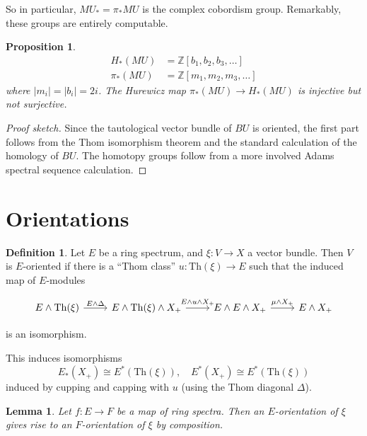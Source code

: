\documentclass{shortart}
\newtheorem{lemma}[thm]{Lemma}
\newtheorem{prop}[thm]{Proposition}
\theoremstyle{definition}
\newtheorem{defi}[thm]{Definition}
\newcommand\Th{\mathrm{Th}}
\newcommand\Z{\mathbb{Z}}
\begin{document}
So in particular, $MU_* = \pi_* MU$ is the complex cobordism group. Remarkably, these groups are entirely computable.
\begin{prop}
  \[
    \begin{aligned}
      H_*(MU) &= \Z[b_1, b_2, b_3, \ldots]\\
      \pi_*(MU) &= \Z[m_1, m_2, m_3, \ldots]
    \end{aligned}
  \]
  where $|m_i| = |b_i| = 2i$. The Hurewicz map $\pi_*(MU) \to H_*(MU)$ is injective but \emph{not} surjective.
\end{prop}

\begin{proof}[Proof sketch]
  Since the tautological vector bundle of $BU$ is oriented, the first part follows from the Thom isomorphism theorem and the standard calculation of the homology of $BU$. The homotopy groups follow from a more involved Adams spectral sequence calculation.
\end{proof}

\section{Orientations}

\begin{defi}
  Let $E$ be a ring spectrum, and $\xi: V \to X$ a vector bundle. Then $V$ is $E$-oriented if there is a ``Thom class'' $u: \Th(\xi) \to E$ such that the induced map of $E$-modules
  \begin{useimager}
    \[
      \begin{tikzcd}
        E \wedge \Th(\xi) \ar[r, "E \wedge \Delta"] & E \wedge \Th(\xi) \wedge X_+ \ar[r, "E \wedge u \wedge X_+"] & E \wedge E \wedge X_+ \ar[r, "\mu \wedge X_+"] & E \wedge X_+
      \end{tikzcd}
    \]
  \end{useimager}
  is an isomorphism.

  This induces isomorphisms
  \[
    E_*(X_+) \cong E^*(\Th(\xi)),\quad E^*(X_+) \cong E^*(\Th(\xi))
  \]
  induced by cupping and capping with $u$ (using the Thom diagonal $\Delta$).
\end{defi}

\begin{lemma}
  Let $f: E \to F$ be a map of ring spectra. Then an $E$-orientation of $\xi$ gives rise to an $F$-orientation of $\xi$ by composition.
\end{lemma}
\end{document}
